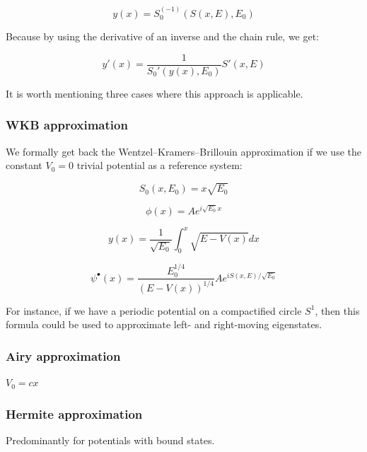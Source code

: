 \documentclass{article}
\theoremstyle{definition}
\begin{document}
\begin{equation}
    y(x) = S_0^{(-1)}(S(x,E),E_0)
\end{equation}

Because by using the derivative of an inverse and the chain rule, we get:

\begin{equation}
    y'(x) = \frac{1}{S_0'(y(x),E_0)} S'(x,E)
\end{equation}

It is worth mentioning three cases where this approach is applicable.

\subsubsection{WKB approximation}

We formally get back the Wentzel–Kramers–Brillouin approximation if we use the constant $V_0=0$ trivial potential as a reference system:

\begin{equation}
    S_0(x,E_0) = x \sqrt{E_0}
\end{equation}

\begin{equation}
    \phi(x) = A e^{i \sqrt{E_0} x}
\end{equation}

\begin{equation}
    y(x) = \frac{1}{\sqrt{E_0}} \int_0^x \sqrt{E-V(x)} dx 
\end{equation}

\begin{equation}
    \psi^\bullet(x) = \frac{E_0^{1/4}}{(E-V(x))^{1/4}} A e^{i S(x,E) / \sqrt{E_0}}
\end{equation}

For instance, if we have a periodic potential on a compactified circle $S^1$, then this formula could be used to approximate left- and right-moving eigenstates.


\subsubsection{Airy approximation}

$V_0=c x$

\subsubsection{Hermite approximation}

Predominantly for potentials with bound states.
\end{document}
